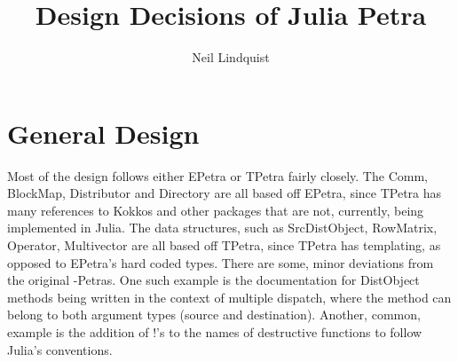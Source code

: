 \documentclass{article}
\title{Design Decisions of Julia Petra}
\author{Neil Lindquist}
\begin{document}
	
\section{General Design}
Most of the design follows either EPetra or TPetra fairly closely.  The Comm, BlockMap, Distributor and Directory are all based off EPetra, since TPetra has many references to Kokkos and other packages that are not, currently, being implemented in Julia.
The data structures, such as SrcDistObject, RowMatrix, Operator, Multivector are all based off TPetra, since TPetra has templating, as opposed to EPetra's hard coded types.
There are some, minor deviations from the original -Petras.
	One such example is the documentation for DistObject methods being written in the context of multiple dispatch, where the method can belong to both argument types (source and destination).  
	Another, common, example is the addition of \(!\)'s to the names of destructive functions to follow Julia's conventions.
\end{document}
